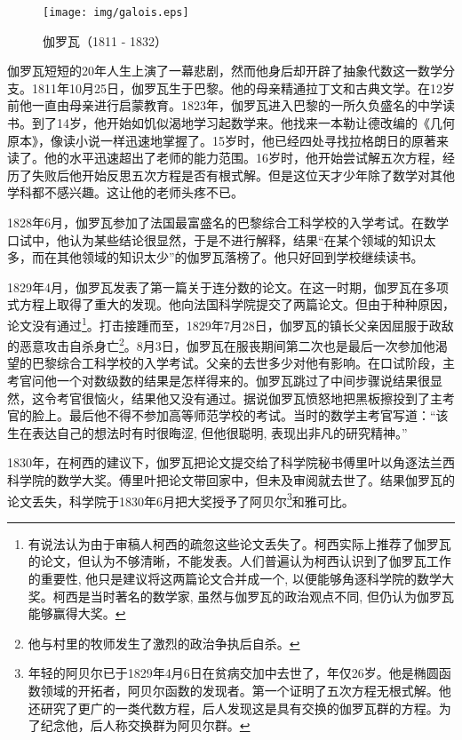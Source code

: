 \documentclass{article}
\begin{document}
\begin{figure}
 \centering
 \texttt{[image: img/galois.eps]}
 \captionsetup{labelformat=empty}
 \caption{伽罗瓦（1811 - 1832）}
 \label{fig:Galois}
\end{figure}

伽罗瓦短短的20年人生上演了一幕悲剧，然而他身后却开辟了抽象代数这一数学分支。1811年10月25日，伽罗瓦生于巴黎。他的母亲精通拉丁文和古典文学。在12岁前他一直由母亲进行启蒙教育。1823年，伽罗瓦进入巴黎的一所久负盛名的中学读书。到了14岁，他开始如饥似渴地学习起数学来。他找来一本勒让德改编的《几何原本》，像读小说一样迅速地掌握了。15岁时，他已经四处寻找拉格朗日的原著来读了。他的水平迅速超出了老师的能力范围。16岁时，他开始尝试解五次方程，经历了失败后他开始反思五次方程是否有根式解。但是这位天才少年除了数学对其他学科都不感兴趣。这让他的老师头疼不已。

1828年6月，伽罗瓦参加了法国最富盛名的巴黎综合工科学校的入学考试。在数学口试中，他认为某些结论很显然，于是不进行解释，结果“在某个领域的知识太多，而在其他领域的知识太少”的伽罗瓦落榜了。他只好回到学校继续读书。

1829年4月，伽罗瓦发表了第一篇关于连分数的论文。在这一时期，伽罗瓦在多项式方程上取得了重大的发现。他向法国科学院提交了两篇论文。但由于种种原因，论文没有通过\footnote{有说法认为由于审稿人柯西的疏忽这些论文丢失了。柯西实际上推荐了伽罗瓦的论文，但认为不够清晰，不能发表。人们普遍认为柯西认识到了伽罗瓦工作的重要性, 他只是建议将这两篇论文合并成一个, 以便能够角逐科学院的数学大奖。柯西是当时著名的数学家, 虽然与伽罗瓦的政治观点不同, 但仍认为伽罗瓦能够赢得大奖。\cite{Wiki-Galois}}。打击接踵而至，1829年7月28日，伽罗瓦的镇长父亲因屈服于政敌的恶意攻击自杀身亡\footnote{他与村里的牧师发生了激烈的政治争执后自杀\cite{Wiki-Galois}。}。8月3日，伽罗瓦在服丧期间第二次也是最后一次参加他渴望的巴黎综合工科学校的入学考试。父亲的去世多少对他有影响。在口试阶段，主考官问他一个对数级数的结果是怎样得来的。伽罗瓦跳过了中间步骤说结果很显然，这令考官很恼火，结果他又没有通过。据说伽罗瓦愤怒地把黑板擦投到了主考官的脸上。最后他不得不参加高等师范学校的考试。当时的数学主考官写道：“该生在表达自己的想法时有时很晦涩, 但他很聪明, 表现出非凡的研究精神。”

1830年，在柯西的建议下，伽罗瓦把论文提交给了科学院秘书傅里叶以角逐法兰西科学院的数学大奖。傅里叶把论文带回家中，但未及审阅就去世了。结果伽罗瓦的论文丢失，科学院于1830年6月把大奖授予了阿贝尔\footnote{年轻的阿贝尔已于1829年4月6日在贫病交加中去世了，年仅26岁。他是椭圆函数领域的开拓者，阿贝尔函数的发现者。第一个证明了五次方程无根式解。他还研究了更广的一类代数方程，后人发现这是具有交换的伽罗瓦群的方程。为了纪念他，后人称交换群为阿贝尔群。}和雅可比\cite{HanXueTao2009}。
\end{document}
